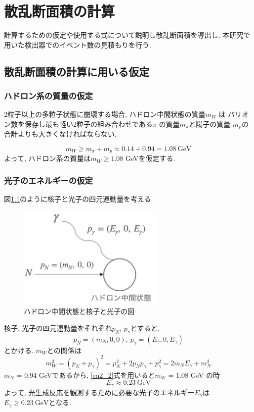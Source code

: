 \chapter{散乱断面積の計算} \label{cha:cross_section}
計算するための仮定や使用する式について説明し散乱断面積を導出し, 本研究で用いた検出器でのイベント数の見積もりを行う.

\section{散乱断面積の計算に用いる仮定}
\subsection{ハドロン系の質量の仮定}
2粒子以上の多粒子状態に崩壊する場合, ハドロン中間状態の質量$m_W$ は バリオン数を保存し最も軽い2粒子の組み合わせである$\pi$ の質量$m_\pi$と陽子の質量 $m_p$の合計よりも大きくなければならない.

\begin{equation}
    m_W \geq m_\pi + m_p \approx 0.14 + 0.94 = 1.08 \ \mathrm{GeV}
\end{equation}
よって, ハドロン系の質量は$m_W \geq 1.08$ GeVを仮定する.

\subsection{光子のエネルギーの仮定}
図\ref{fig:sigma1}のように核子と光子の四元運動量を考える.
\begin{figure}[H]
    \centering
    \includegraphics[height=5cm]{img/diagram_momentum.png}
    \caption{ハドロン中間状態と核子と光子の図}
    \label{fig:sigma1}
\end{figure}
核子, 光子の四元運動量をそれぞれ$p_N$, $p_\gamma$とすると,
\begin{equation}
    p_N = (m_N, 0, 0),\  p_\gamma = (E_\gamma, 0,  E_\gamma)
\end{equation}
とかける.
$m_W$との関係は
\begin{equation}
    \label{eq2_2}
    m_W^2 = (p_N + p_\gamma)^2 = p_N^2 + 2p_N p_\gamma + p_\gamma^2
    = 2m_N E_\gamma + m_N^2
\end{equation}
$m_N$ = 0.94 GeVであるから, \ref{eq2_2}式を用いると$m_W$ = 1.08 GeV の時
\begin{equation}
    E_\gamma \approx 0.23 \ \mathrm{GeV}
\end{equation}
よって, 光生成反応を観測するために必要な光子のエネルギー$E_\gamma$は
$E_\gamma \geq 0.23 \ \mathrm{GeV}$となる.


